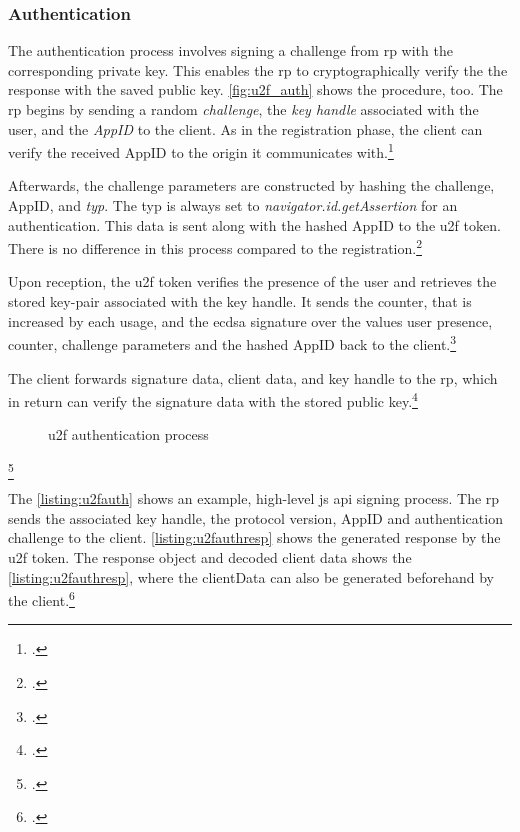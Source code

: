 \subsubsection{Authentication}

The authentication process involves signing a challenge from \gls{rp} with the corresponding private key. This enables the \gls{rp} to cryptographically verify the the response with the saved public key. \autoref{fig:u2f_auth} shows the procedure, too. The \gls{rp} begins by sending a random \textit{challenge}, the \textit{key handle} associated with the user, and the \textit{AppID} to the client. As in the registration phase, the client can verify the received AppID to the origin it communicates with.\footcites[See][3]{7860546}[See][6]{u2f-js-api}

Afterwards, the challenge parameters are constructed by hashing the challenge, AppID, and \textit{typ}. The typ is always set to \textit{navigator.id.getAssertion} for an authentication. This data is sent along with the hashed AppID to the \gls{u2f} token. There is no difference in this process compared to the registration.\footcites[See][6]{u2f-raw-message}

Upon reception, the \gls{u2f} token verifies the presence of the user and retrieves the stored key-pair associated with the key handle. It sends the counter, that is increased by each usage, and the \gls{ecdsa} signature over the values user presence, counter, challenge parameters and the hashed AppID back to the client.\footcites[431]{10.1007/978-3-662-54970-4_25}[See][7]{u2f-raw-message}

The client forwards signature data, client data, and key handle to the \gls{rp}, which in return can verify the signature data with the stored public key.\footcites[See][118]{IdentityandDataSecurityforWebDevelopment}

\begin{figure}[hbt]
	\centering
	
	\caption[\gls{u2f} authentication process]{\gls{u2f} authentication process\footnotemark}
	\label{fig:u2f_auth}
\end{figure}
\footcitetexts[Source: diagram by author, based on][70]{10.1007/978-3-319-75650-9_5}[][428]{10.1007/978-3-662-54970-4_25}

The \autoref{listing:u2fauth} shows an example, high-level \gls{js} \gls{api} signing process. The \gls{rp} sends the associated key handle, the protocol version, AppID and authentication challenge to the client. \autoref{listing:u2fauthresp} shows the generated response by the \gls{u2f} token. The response object and decoded client data shows the \autoref{listing:u2fauthresp}, where the clientData can also be generated beforehand by the client.\footcites[See][3]{u2f-js-api}

